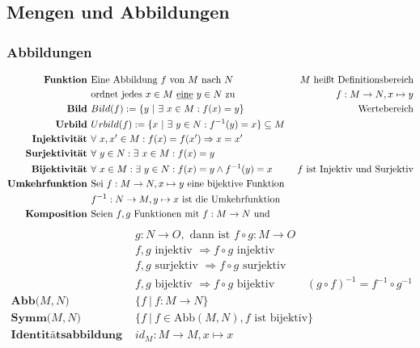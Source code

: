 \documentclass{article}
\begin{document}
	\subsection*{Mengen und Abbildungen}
		\subsubsection*{Abbildungen}
			\begin{align*}
				\textbf{Funktion } & \text{Eine Abbildung } f \text{ von } M \text{ nach } N & M \text{ hei\ss t Definitionsbereich}\\
				& \text{ordnet jedes } x \in M \text{ \underline{eine} } y \in N \text{ zu} & f: M \rightarrow N, x \mapsto y\\
				\textbf{Bild } & Bild(f) := \{y\ |\ \exists\ x \in M: f(x) = y \} & \text{ Wertebereich}\\
				\textbf{Urbild } & Urbild(f) := \{x\ |\ \exists\ y \in N: f^{-1}(y) = x\} \subseteq M\\
				\textbf{Injektivit\"at } & \forall\ x, x' \in M: f(x) = f(x') \Rightarrow x = x'& \\
				\textbf{Surjektivit\"at } & \forall\ y \in N: \exists\ x \in M: f(x) = y& \\
				\textbf{Bijektivit\"at } & \forall\ x \in M: \exists\ y \in N: f(x) = y \wedge f^{-1}(y) = x& f \text{ ist Injektiv und Surjektiv}\\
				\textbf{Umkehrfunktion } & \text{Sei } f: M \rightarrow N, x \mapsto y \text{ eine bijektive Funktion }\\
				& f^{-1}: N \rightarrow M, y \mapsto x \text{ ist die Umkehrfunktion }\\
				\textbf{Komposition } & \text{Seien } f, g \text{ Funktionen mit } f: M \rightarrow N \text{ und }\\
			\end{align*}
			\begin{align*}
				& g: N \rightarrow O, \text{ dann ist } f \circ g: M \rightarrow O\\
				& f, g \text{ injektiv } \Rightarrow f \circ g \text{ injektiv}\\
				& f, g \text{ surjektiv } \Rightarrow f \circ g \text{ surjektiv}\\
				& f, g \text{ bijektiv } \Rightarrow f \circ g \text{ bijektiv} & (g \circ f)^{-1} = f^{-1} \circ g^{-1}\\
				\textbf{Abb($M, N$) } & \{f\ |\ f: M \rightarrow N\}\\
				\textbf{Symm($M, N$) } & \{f\ |\ f \in \text{Abb}(M, N), f \text{ ist bijektiv}\}\\
				\textbf{Identit\"atsabbildung } & id_M: M\rightarrow M, x \mapsto x
			\end{align*}
\end{document}
